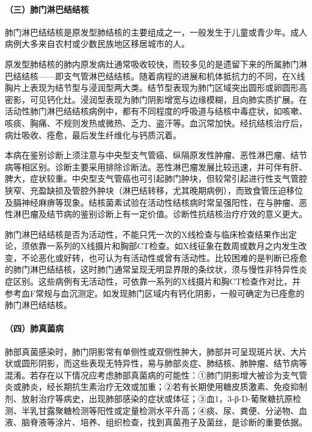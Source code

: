 \paragraph{（三）肺门淋巴结结核}

肺门淋巴结结核是原发型肺结核的主要组成之一，一般发生于儿童或青少年。成人病例大多来自农村或少数民族地区移居城市的人。

原发型肺结核的肺内原发病灶通常吸收较快，而较多见的是遗留下来的所属肺门淋巴结结核------即支气管淋巴结结核。随着病程的进展和机体抵抗力的不同，在X线胸片上表现为结节型与浸润型两大类。结节型表现为肺门区域突出圆形或卵圆形高密影，可见钙化灶。浸润型表现为肺门阴影增宽与边缘模糊，且向肺实质扩展。在活动性肺门淋巴结结核病例中，都有不同程度的呼吸道与结核中毒症状，如咳嗽、咳痰、胸痛、不规则发热或微热、乏力、盗汗等。血沉常加快。经抗结核治疗后，病灶吸收、痊愈，最后发生纤维化与钙质沉着。

本病在鉴别诊断上须注意与中央型支气管癌、纵隔原发性肿瘤、恶性淋巴瘤、结节病等相区别。诊断主要采用排除诊断法。恶性淋巴瘤发展比较迅速，并可伴有肝、脾大，症状较重。中央型支气管癌也可引起肺门肿块，但较常引起进行性支气管腔狭窄、充盈缺损及管腔外肿块（淋巴结转移，尤其晚期病例），而致食管压迫移位及膈神经麻痹等现象。结核菌素试验在活动性结核病时常呈强阳性，在与肿瘤、恶性淋巴瘤及结节病的鉴别诊断上有一定价值。诊断性抗结核治疗疗效的意义更大。

肺门淋巴结结核是否为活动性，不能只凭一次的X线检查与临床检查结果作出定论，须依靠一系列的X线摄片和胸部CT检查。如X线征象在数周或数月之内发生改变，不论恶化或好转，也可认为有活动性或曾有活动性。比较困难的是判断已痊愈的肺门淋巴结结核，这时肺门通常呈现无明显界限的条纹状，须与慢性非特异性炎症区别。这些病例有无活动性，可依靠一系列的X线摄片和胸CT检查作对比，并参考血F常规与血沉测定。如发现肺门区域内有钙化阴影，一般可确定为已痊愈的肺门淋巴结结核。

\paragraph{（四）肺真菌病}

肺部真菌感染时，肺门阴影常有单侧性或双侧性肿大，肺部并可呈现斑片状、大片状或圆形阴影，而这些表现无特异性，易与肺部炎症、肺结核、肺肿瘤、结节病等混淆。若存在以下情况应考虑肺部真菌病的可能性：①肺门阴影增大被诊为支气管炎或肺炎，经长期抗生素治疗无效或加重；②若有长期使用糖皮质激素、免疫抑制剂、放射治疗等病史，出现肺部感染的症状或体征；③血1，3-β-D-葡聚糖抗原检测、半乳甘露聚糖检测等阳性或定量检测水平升高；④痰、尿、粪便、分泌物、血液、脑脊液等涂片、培养、组织检查，找到真菌孢子及菌丝，是诊断的重要依据。

